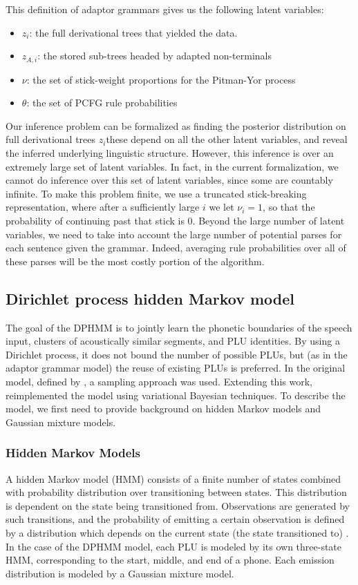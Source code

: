 \documentclass[12pt,letterpaper]{article}
\begin{document}
This definition of adaptor grammars gives us the following latent variables: 
\begin{itemize}
\item $z_i$: the full derivational trees that yielded the data. 
\item $z_{A,i}$: the stored sub-trees headed by adapted non-terminals
\item $\nu$: the set of stick-weight proportions for the Pitman-Yor process
\item $\theta$: the set of PCFG rule probabilities 
\end{itemize}
Our inference problem can be formalized as finding the posterior distribution on full derivational trees $z_i$\textemdash these depend on all the other latent variables, and reveal the inferred underlying linguistic structure. However, this inference is over an extremely large set of latent variables. In fact, in the current formalization, we cannot do inference over this set of latent variables, since some are countably infinite. To make this problem finite, we use a truncated stick-breaking representation, where after a sufficiently large $i$ we let $\nu_i = 1$, so that the probability of continuing past that stick is 0. Beyond the large number of latent variables, we need to take into account the large number of potential parses for each sentence given the grammar. Indeed, averaging rule probabilities over all of these parses will be the most costly portion of the algorithm. 

\subsection{Dirichlet process hidden Markov model}
The goal of the DPHMM is to jointly learn the phonetic boundaries of the speech input, clusters of acoustically similar segments, and PLU identities. By using a Dirichlet process, it does not bound the number of possible PLUs, but (as in the adaptor grammar model) the reuse of existing PLUs is preferred. In the original model, defined by \citet{lee:2012}, a sampling approach was used. Extending this work, \citet{ondel:2016} reimplemented the model using variational Bayesian techniques. To describe the model, we first need to provide background on hidden Markov models and Gaussian mixture models.
\subsubsection{Hidden Markov Models}
A hidden Markov model (HMM) consists of a finite number of states combined with probability distribution over transitioning between states. This distribution is dependent on the state being transitioned from. Observations are generated by such transitions, and the probability of emitting a certain observation is defined by a distribution which depends on the current state (the state transitioned to) \citep{rabiner:1986}. In the case of the DPHMM model, each PLU is modeled by its own three-state HMM, corresponding to the start, middle, and end of a phone. Each emission distribution is modeled by a Gaussian mixture model. 
\end{document}

